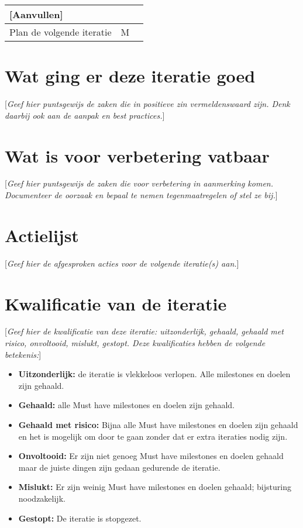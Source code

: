 \documentclass[a4paper, 11pt, oneside]{article}
\begin{document}
\begin{table}[H]
\begin{tabular}{|l|l|l|}
		{[}Aanvullen{]}                                                                                                                                                               &                                                                   &                                                                               \\ \hline
		Plan de volgende iteratie                                                                                                                                                     & M                                                                 &        \\ \hline
	\end{tabular}
\end{table}

\section{Wat ging er deze iteratie goed}
{[}\textit{Geef hier puntsgewijs de zaken die in positieve zin vermeldenswaard zijn. Denk daarbij ook aan de aanpak en best practices.}{]}

\section{Wat is voor verbetering vatbaar}
{[}\textit{Geef hier puntsgewijs de zaken die voor verbetering in aanmerking komen. Documenteer de oorzaak en bepaal te nemen tegenmaatregelen of stel ze bij.}{]}

\section{Actielijst}
{[}\textit{Geef hier de afgesproken acties voor de volgende iteratie(s) aan.}{]}

\section{Kwalificatie van de iteratie}
{[}\textit{Geef hier de kwalificatie van deze iteratie: uitzonderlijk, gehaald, gehaald met risico, onvoltooid, mislukt, gestopt. Deze kwalificaties hebben de volgende betekenis:}{]}
\begin{itemize}
\item \textbf{Uitzonderlijk: }de iteratie is vlekkeloos verlopen. Alle milestones en doelen zijn gehaald.
\item \textbf{Gehaald:} alle Must have milestones en doelen zijn gehaald.
\item \textbf{Gehaald met risico:} Bijna alle Must have milestones en doelen zijn gehaald en het is mogelijk om door te gaan zonder dat er extra iteraties nodig zijn.
\item \textbf{Onvoltooid:} Er zijn niet genoeg Must have milestones en doelen gehaald maar de juiste dingen zijn gedaan gedurende de iteratie.
\item \textbf{Mislukt:} Er zijn weinig Must have milestones en doelen gehaald; bijsturing noodzakelijk.
\item \textbf{Gestopt:} De iteratie is stopgezet.
 
\end{itemize}
\end{document}
